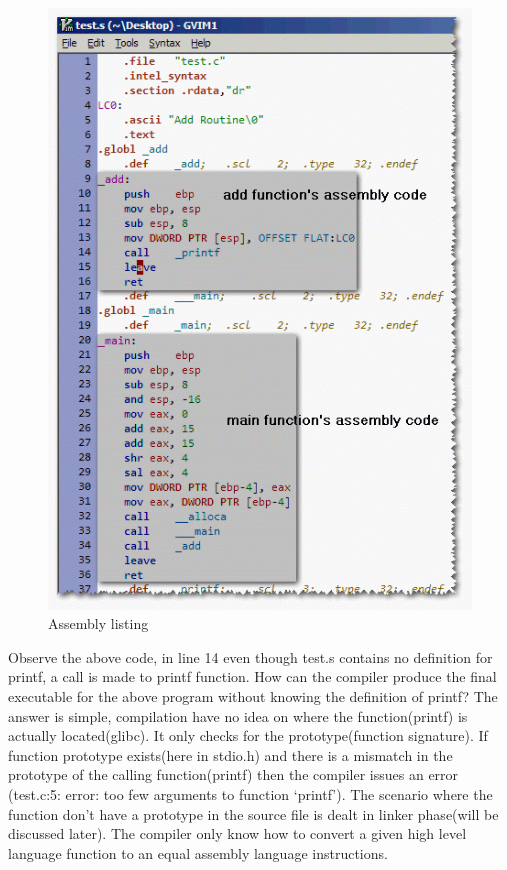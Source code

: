 \documentclass{article}
\begin{document}
\begin{figure}[H]
\centering
\includegraphics[width=\textwidth]{Compliation1.png}
\caption{Assembly listing}
\end{figure}

Observe the above code, in line 14 even though test.s contains no definition for printf, a call is made to printf function. How can the compiler produce the final executable for the above program without knowing the definition of printf? The answer is simple, compilation have no idea on where the function(printf) is actually located(glibc). It only checks for the prototype(function signature). If function prototype exists(here in stdio.h) and there is a mismatch in the prototype of the calling function(printf) then the compiler issues an error (test.c:5: error: too few arguments to function `printf'). The scenario where the function don't have a prototype in the source file is dealt in linker phase(will be discussed later). The compiler only know how to convert a given high level language function to an equal assembly language instructions.
\end{document}
